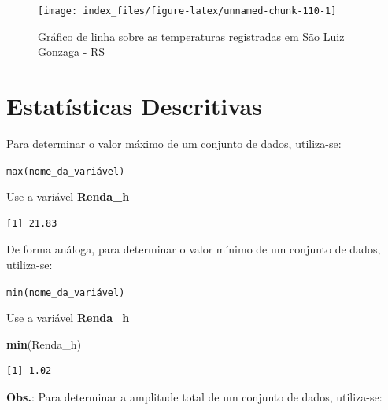 \documentclass[12pt,brazil,oneside]{book}
\newenvironment{Shaded}{\begin{snugshade}}{\end{snugshade}}
\newcommand{\CommentTok}[1]{\textcolor[rgb]{0.56,0.35,0.01}{\textit{#1}}}
\newcommand{\KeywordTok}[1]{\textcolor[rgb]{0.13,0.29,0.53}{\textbf{#1}}}
\newcommand{\NormalTok}[1]{#1}
\newcommand{\OperatorTok}[1]{\textcolor[rgb]{0.81,0.36,0.00}{\textbf{#1}}}
\begin{document}
\begin{figure}[H]

{\centering \texttt{[image: index\_files/figure-latex/unnamed-chunk-110-1]} 

}

\caption{Gráfico de linha sobre as temperaturas registradas em São Luiz Gonzaga - RS}\label{fig:unnamed-chunk-110}
\end{figure}

\hypertarget{estatisticas-descritivas}{%
\section{Estatísticas Descritivas}\label{estatisticas-descritivas}}

Para determinar o valor máximo de um conjunto de dados, utiliza-se:

\texttt{max(nome\_da\_variável)}

Use a variável \textbf{Renda\_h}

\begin{Shaded}
\end{Shaded}

\begin{verbatim}
[1] 21.83
\end{verbatim}

De forma análoga, para determinar o valor mínimo de um conjunto de dados, utiliza-se:

\texttt{min(nome\_da\_variável)}

Use a variável \textbf{Renda\_h}

\begin{Shaded}
\begin{Highlighting}[]
\KeywordTok{min}\NormalTok{(Renda_h)}
\end{Highlighting}
\end{Shaded}

\begin{verbatim}
[1] 1.02
\end{verbatim}

\textbf{Obs.}: Para determinar a amplitude total de um conjunto de dados, utiliza-se:
\end{document}
